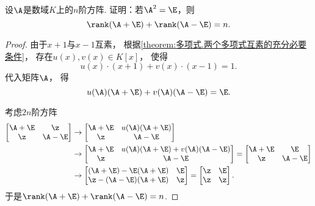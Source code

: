\begin{example}
设\(\A\)是数域\(K\)上的\(n\)阶方阵.
证明：若\(\A^2=\E\)，则\[
	\rank(\A+\E)+\rank(\A-\E)=n.
\]
\begin{proof}
由于\(x+1\)与\(x-1\)互素，
根据\cref{theorem:多项式.两个多项式互素的充分必要条件}，
存在\(u(x),v(x) \in K[x]\)，
使得\[
	u(x) \cdot (x+1) + v(x) \cdot (x-1) = 1.
\]
代入矩阵\(\A\)，
得\[
	u(\A) (\A+\E) + v(\A) (\A-\E) = \E.
\]

考虑\(2n\)阶方阵
\begin{align*}
	\begin{bmatrix}
		\A+\E & \z \\
		\z & \A-\E
	\end{bmatrix}
	&\to
	\begin{bmatrix}
		\A+\E & u(\A) (\A+\E) \\
		\z & \A-\E
	\end{bmatrix} \\
	&\to
	\begin{bmatrix}
		\A+\E & u(\A) (\A+\E) + v(\A) (\A-\E) \\
		\z & \A-\E
	\end{bmatrix}
	=\begin{bmatrix}
		\A+\E & \E \\
		\z & \A-\E
	\end{bmatrix} \\
	&\to
	\begin{bmatrix}
		(\A+\E)-\E(\A+\E) & \E \\
		\z-(\A-\E)(\A+\E) & \z
	\end{bmatrix}
	=\begin{bmatrix}
		\z & \E \\
		\z & \z
	\end{bmatrix}.
\end{align*}
于是\(\rank(\A+\E)+\rank(\A-\E)=n\).
\end{proof}
\end{example}
